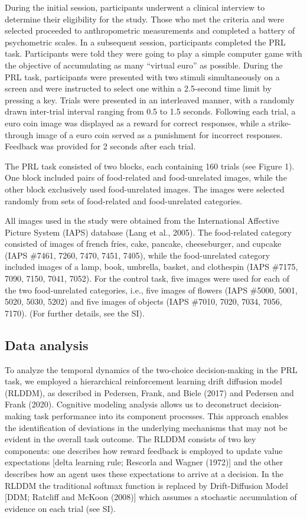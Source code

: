 \documentclass[
  man,floatsintext]{apa6}
\begin{document}
During the initial session, participants underwent a clinical interview to determine their eligibility for the study. Those who met the criteria and were selected proceeded to anthropometric measurements and completed a battery of psychometric scales. In a subsequent session, participants completed the PRL task. Participants were told they were going to play a simple computer game with the objective of accumulating as many ``virtual euro'' as possible. During the PRL task, participants were presented with two stimuli simultaneously on a screen and were instructed to select one within a 2.5-second time limit by pressing a key. Trials were presented in an interleaved manner, with a randomly drawn inter-trial interval ranging from 0.5 to 1.5 seconds. Following each trial, a euro coin image was displayed as a reward for correct responses, while a strike-through image of a euro coin served as a punishment for incorrect responses. Feedback was provided for 2 seconds after each trial.

The PRL task consisted of two blocks, each containing 160 trials (see Figure 1). One block included pairs of food-related and food-unrelated images, while the other block exclusively used food-unrelated images. The images were selected randomly from sets of food-related and food-unrelated categories.

All images used in the study were obtained from the International Affective Picture System (IAPS) database (Lang et al., 2005). The food-related category consisted of images of french fries, cake, pancake, cheeseburger, and cupcake (IAPS \#7461, 7260, 7470, 7451, 7405), while the food-unrelated category included images of a lamp, book, umbrella, basket, and clothespin (IAPS \#7175, 7090, 7150, 7041, 7052). For the control task, five images were used for each of the two food-unrelated categories, i.e., five images of flowers (IAPS \#5000, 5001, 5020, 5030, 5202) and five images of objects (IAPS \#7010, 7020, 7034, 7056, 7170). (For further details, see the SI).

\hypertarget{data-analysis}{%
\subsection{Data analysis}\label{data-analysis}}

To analyze the temporal dynamics of the two-choice decision-making in the PRL task, we employed a hierarchical reinforcement learning drift diffusion model (RLDDM), as described in Pedersen, Frank, and Biele (2017) and Pedersen and Frank (2020). Cognitive modeling analysis allows us to deconstruct decision-making task performance into its component processes. This approach enables the identification of deviations in the underlying mechanisms that may not be evident in the overall task outcome. The RLDDM consists of two key components: one describes how reward feedback is employed to update value expectations {[}delta learning rule; Rescorla and Wagner (1972){]} and the other describes how an agent uses these expectations to arrive at a decision. In the RLDDM the traditional softmax function is replaced by Drift-Diffusion Model {[}DDM; Ratcliff and McKoon (2008){]} which assumes a stochastic accumulation of evidence on each trial (see SI).
\end{document}
